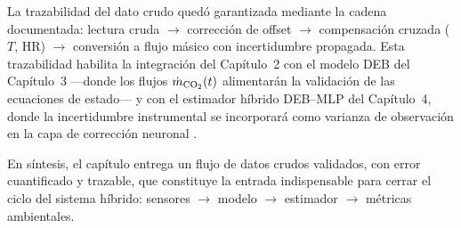 La trazabilidad del dato crudo quedó garantizada mediante la cadena documentada: lectura cruda $\rightarrow$ corrección de offset $\rightarrow$ compensación cruzada ($T$, HR) $\rightarrow$ conversión a flujo másico con incertidumbre propagada. Esta trazabilidad habilita la integración del Capítulo~2 con el modelo DEB del Capítulo~3 ---donde los flujos $\dot{m}_{\ce{CO2}}(t)$ alimentarán la validación de las ecuaciones de estado--- y con el estimador híbrido DEB--MLP del Capítulo~4, donde la incertidumbre instrumental se incorporará como varianza de observación en la capa de corrección neuronal \parencite{eriksenDynamicModellingFeed2022, padmanabhaComprehensiveDynamicGrowth2020}.

En síntesis, el capítulo entrega un flujo de datos crudos validados, con error cuantificado y trazable, que constituye la entrada indispensable para cerrar el ciclo del sistema híbrido: sensores $\rightarrow$ modelo $\rightarrow$ estimador $\rightarrow$ métricas ambientales.